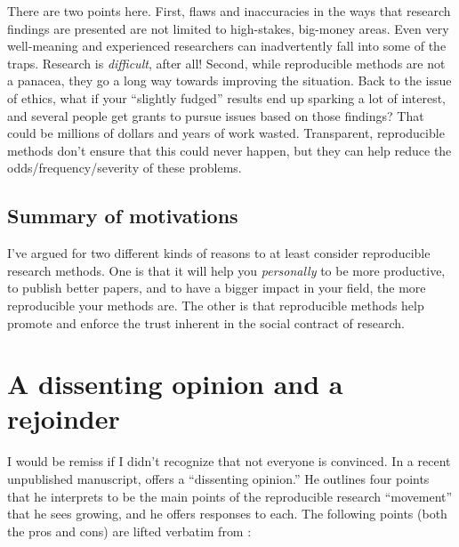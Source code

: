 \documentclass{book}
\begin{document}
There are two points here. First, flaws and inaccuracies in the ways that research findings are presented are not limited to high-stakes, big-money areas. Even very well-meaning and experienced researchers can inadvertently fall into some of the traps. Research is \emph{difficult}, after all!  Second, while reproducible methods are not a panacea, they go a long way towards improving the situation. Back to the issue of ethics, what if your ``slightly fudged'' results end up sparking a lot of interest, and several people get grants to pursue issues based on those findings? That could be millions of dollars and years of work wasted.  Transparent, reproducible methods don't ensure that this could never happen, but they can help reduce the odds/frequency/severity of these problems.
\subsection{Summary of motivations}
\label{sec-2-3-3}

I've argued for two different kinds of reasons to at least consider reproducible research methods. One is that it will help you \emph{personally} to be more productive, to publish better papers, and to have a bigger impact in your field, the more reproducible your methods are. The other is that reproducible methods help promote and enforce the trust inherent in the social contract of research.  
\section{A dissenting opinion and a rejoinder}
\label{sec-2-4}
\label{dissenting}

I would be remiss if I didn't recognize that not everyone is convinced. In a recent unpublished manuscript, \textcite{drummond2012reproducible} offers a ``dissenting opinion.'' He outlines four points that he interprets to be the main points of the reproducible research ``movement'' that he sees growing, and he offers responses to each. The following points (both the pros and cons) are lifted verbatim from \textcite[][p.2--3]{drummond2012reproducible}:
\end{document}

